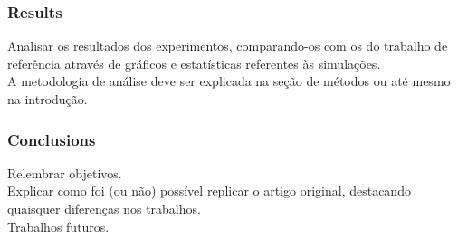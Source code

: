 \subsubsection{Results}

Analisar os resultados dos experimentos, comparando-os com os do trabalho de referência através de gráficos e estatísticas referentes às simulações.\\
A metodologia de análise deve ser explicada na seção de métodos ou até mesmo na introdução.\\


\subsubsection{Conclusions}

Relembrar objetivos.\\
Explicar como foi (ou não) possível replicar o artigo original, destacando quaisquer diferenças nos trabalhos.\\
Trabalhos futuros.\\
